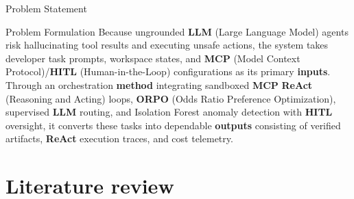 \documentclass[aspectratio=169,10pt]{beamer}
\begin{document}
\begin{frame}{Problem Statement}
\vspace{0.25cm}
\begin{block}{Problem Formulation}
\normalsize
Because ungrounded \textbf{LLM} (Large Language Model) agents risk hallucinating tool results and executing unsafe actions, the system takes developer task prompts, workspace states, and \textbf{MCP} (Model Context Protocol)/\textbf{HITL} (Human-in-the-Loop) configurations as its primary \textbf{inputs}. Through an orchestration \textbf{method} integrating sandboxed \textbf{MCP} \textbf{ReAct} (Reasoning and Acting) loops, \textbf{ORPO} (Odds Ratio Preference Optimization), supervised \textbf{LLM} routing, and Isolation Forest anomaly detection with \textbf{HITL} oversight, it converts these tasks into dependable \textbf{outputs} consisting of verified artifacts, \textbf{ReAct} execution traces, and cost telemetry.
\end{block}
\end{frame}

\section{Literature review}
\end{document}
